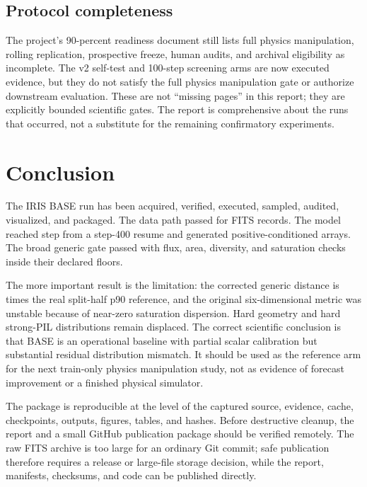 \documentclass[11pt,oneside]{report}
\begin{document}
\section{Protocol completeness}

The project’s 90-percent readiness document still lists full physics manipulation, rolling replication, prospective freeze, human audits, and archival eligibility as incomplete. The v2 self-test and 100-step screening arms are now executed evidence, but they do not satisfy the full physics manipulation gate or authorize downstream evaluation. These are not “missing pages” in this report; they are explicitly bounded scientific gates. The report is comprehensive about the runs that occurred, not a substitute for the remaining confirmatory experiments.

\chapter{Conclusion}

The IRIS BASE run has been acquired, verified, executed, sampled, audited, visualized, and packaged. The data path passed for \AcquiredCount{} FITS records. The model reached step \BaseSteps{} from a step-400 resume and generated \SyntheticCount{} positive-conditioned arrays. The broad generic gate passed with flux, area, diversity, and saturation checks inside their declared floors.

The more important result is the limitation: the corrected generic distance is \AuditDistanceRatio{} times the real split-half p90 reference, and the original six-dimensional metric was unstable because of near-zero saturation dispersion. Hard geometry and hard strong-PIL distributions remain displaced. The correct scientific conclusion is that BASE is an operational baseline with partial scalar calibration but substantial residual distribution mismatch. It should be used as the reference arm for the next train-only physics manipulation study, not as evidence of forecast improvement or a finished physical simulator.

The package is reproducible at the level of the captured source, evidence, cache, checkpoints, outputs, figures, tables, and hashes. Before destructive cleanup, the report and a small GitHub publication package should be verified remotely. The raw FITS archive is too large for an ordinary Git commit; safe publication therefore requires a release or large-file storage decision, while the report, manifests, checksums, and code can be published directly.
\end{document}
